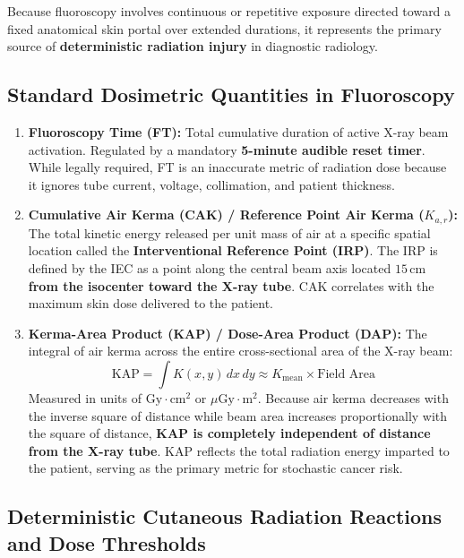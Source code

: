 \documentclass[11pt,a4paper]{article}
\begin{document}
Because fluoroscopy involves continuous or repetitive exposure directed toward a fixed anatomical skin portal over extended durations, it represents the primary source of \textbf{deterministic radiation injury} in diagnostic radiology.

\subsection{Standard Dosimetric Quantities in Fluoroscopy}

\begin{enumerate}[leftmargin=*]
    \item \textbf{Fluoroscopy Time (FT):} Total cumulative duration of active X-ray beam activation. Regulated by a mandatory \textbf{5-minute audible reset timer}. While legally required, FT is an inaccurate metric of radiation dose because it ignores tube current, voltage, collimation, and patient thickness.
    \item \textbf{Cumulative Air Kerma (CAK) / Reference Point Air Kerma ($K_{a,r}$):} The total kinetic energy released per unit mass of air at a specific spatial location called the \textbf{Interventional Reference Point (IRP)}. The IRP is defined by the IEC as a point along the central beam axis located \textbf{$15\,\text{cm}$ from the isocenter toward the X-ray tube}. CAK correlates with the maximum skin dose delivered to the patient.
    \item \textbf{Kerma-Area Product (KAP) / Dose-Area Product (DAP):} The integral of air kerma across the entire cross-sectional area of the X-ray beam:
    \begin{equation}
        \text{KAP} = \int K(x,y) \, dx \, dy \approx K_{\text{mean}} \times \text{Field Area}
    \end{equation}
    Measured in units of $\text{Gy}\cdot\text{cm}^2$ or $\mu\text{Gy}\cdot\text{m}^2$. Because air kerma decreases with the inverse square of distance while beam area increases proportionally with the square of distance, \textbf{KAP is completely independent of distance from the X-ray tube}. KAP reflects the total radiation energy imparted to the patient, serving as the primary metric for stochastic cancer risk.
\end{enumerate}

\subsection{Deterministic Cutaneous Radiation Reactions and Dose Thresholds}
\end{document}
